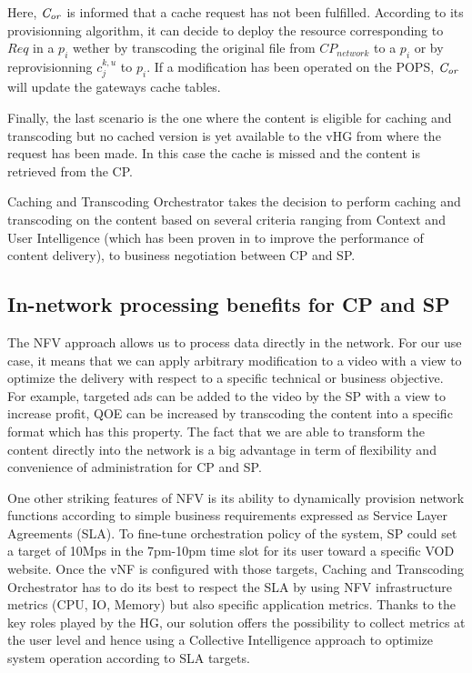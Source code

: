 Here, $\mathit{C_{or}}$ is informed that a cache request has not been fulfilled. According to its provisionning algorithm, it can decide to deploy the resource corresponding to $\mathit{Req}$ in a $p_{i}$ wether by transcoding the original file from \(\mathit{CP}_{\mathit{network}}\) to a $p_{i}$ or by reprovisionning $c^{k,u}_{j}$ to $p_{i}$.
 If a modification has been operated on the POPS, $\mathit{C_{or}}$ will update the gateways cache tables.

Finally, the last scenario is the one where the content is eligible for caching and transcoding but no cached version is yet available to the vHG from where the request has been made.
In this case the cache is missed and the content is retrieved from the CP.

Caching and Transcoding Orchestrator takes the decision to perform caching and transcoding on the content based on several criteria ranging from Context and User Intelligence (which has been proven in \cite{wang_cpcdn:_2015} to improve the performance of content delivery), to business negotiation between CP and SP.

\subsection{In-network processing benefits for CP and SP}
The NFV approach allows us to process data directly in the network.
For our use case, it means that we can apply arbitrary modification to a video with a view to optimize the delivery with respect to a specific technical or business objective.
For example, targeted ads can be added to the video by the SP with a view to increase profit, QOE can be increased by transcoding the content into a specific format which has this property.
The fact that we are able to transform the content directly into the network is a big advantage in term of flexibility and convenience of administration for CP and SP.

One other striking features of NFV is its ability to dynamically provision network functions according to simple business requirements expressed as Service Layer Agreements (SLA).
To fine-tune orchestration policy of the system, SP could set a target of 10Mps in the 7pm-10pm time slot for its user toward a specific VOD website.
Once the vNF is configured with those targets, Caching and Transcoding Orchestrator has to do its best to respect the SLA by using NFV infrastructure metrics (CPU, IO, Memory) but also specific application metrics.
Thanks to the key roles played by the HG, our solution offers the possibility to collect metrics at the user level and hence using a Collective Intelligence approach to optimize system operation according to SLA targets. 

